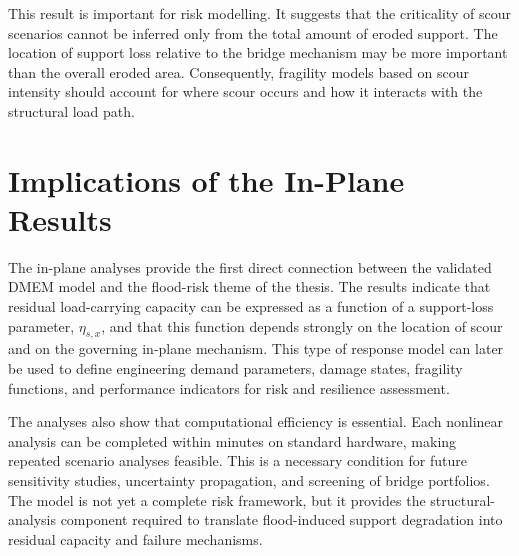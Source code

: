 This result is important for risk modelling. It suggests that the criticality of scour scenarios cannot be inferred only from the total amount of eroded support. The location of support loss relative to the bridge mechanism may be more important than the overall eroded area. Consequently, fragility models based on scour intensity should account for where scour occurs and how it interacts with the structural load path.

\section{Implications of the In-Plane Results}
\label{sec:dmem-scour-framework}

The in-plane analyses provide the first direct connection between the validated \gls{DMEM} model and the flood-risk theme of the thesis. The results indicate that residual load-carrying capacity can be expressed as a function of a support-loss parameter, $\eta_{s,x}$, and that this function depends strongly on the location of scour and on the governing in-plane mechanism. This type of response model can later be used to define engineering demand parameters, damage states, fragility functions, and performance indicators for risk and resilience assessment.

The analyses also show that computational efficiency is essential. Each nonlinear analysis can be completed within minutes on standard hardware, making repeated scenario analyses feasible. This is a necessary condition for future sensitivity studies, uncertainty propagation, and screening of bridge portfolios. The model is not yet a complete risk framework, but it provides the structural-analysis component required to translate flood-induced support degradation into residual capacity and failure mechanisms.

